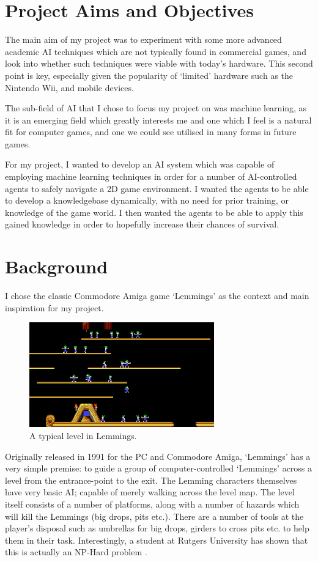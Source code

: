 \documentclass[a4paper,oneside]{report}
\begin{document}
\section{Project Aims and Objectives}

The main aim of my project was to experiment with some more advanced academic AI techniques which are not typically found in commercial games, and look into whether such techniques were viable with today's hardware. This second point is key, especially given the popularity of `limited' hardware such as the Nintendo Wii, and mobile devices.

The sub-field of AI that I chose to focus my project on was machine learning, as it is an emerging field which greatly interests me and one which I feel is a natural fit for computer games, and one we could see utilised in many forms in future games.

For my project, I wanted to develop an AI system which was capable of employing machine learning techniques in order for a number of AI-controlled agents to safely navigate a 2D game environment. I wanted the agents to be able to develop a knowledgebase dynamically, with no need for prior training, or knowledge of the game world. I then wanted the agents to be able to apply this gained knowledge in order to hopefully increase their chances of survival. 

\section{Background}

I chose the classic Commodore Amiga game `Lemmings' as the context and main inspiration for my project.

\begin{figure}
  \centering
    \includegraphics[width=80mm]{sources/images/lemmings3}
    \caption{A typical level in Lemmings.\label{screen}}
\end{figure}

Originally released in 1991 for the PC and Commodore Amiga, `Lemmings' has a very simple premise: to guide a group of computer-controlled `Lemmings' across a level from the entrance-point to the exit. The Lemming characters themselves have very basic AI; capable of merely walking across the level map. The level itself consists of a number of platforms, along with a number of hazards which will kill the Lemmings (big drops, pits etc.). There are a number of tools at the player's disposal such as umbrellas for big drops, girders to cross pits etc. to help them in their task. Interestingly, a student at Rutgers University has shown that this is actually an NP-Hard problem \cite{Cormode:fk}.
\end{document}
